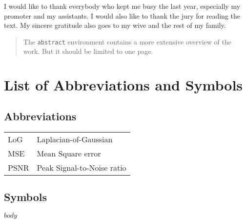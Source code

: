 \documentclass[master=cws,masteroption=ai]{kulemt}
\begin{document}
\begin{preface}
  I would like to thank everybody who kept me busy the last year,
  especially my promoter and my assistants. I would also like to thank the
  jury for reading the text. My sincere gratitude also goes to my wive and
  the rest of my family.
\end{preface}

\tableofcontents*

\begin{abstract}
  The \texttt{abstract} environment contains a more extensive overview of
  the work. But it should be limited to one page.
\end{abstract}

\listoffiguresandtables
\chapter{List of Abbreviations and Symbols}
\section*{Abbreviations}
\begin{flushleft}
  \renewcommand{\arraystretch}{1.1}
  \begin{tabularx}{\textwidth}{@{}p{12mm}X@{}}
    LoG   & Laplacian-of-Gaussian \\
    MSE   & Mean Square error \\
    PSNR  & Peak Signal-to-Noise ratio \\
  \end{tabularx}
\end{flushleft}
\section*{Symbols}


\mainmatter

% 
% 
% 
% 
% 
%
% 
% 
$body$

\backmatter



\end{document}
